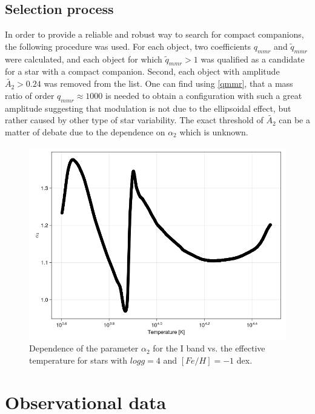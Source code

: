 \documentclass{pracalicmgr}
\begin{document}
\section{Selection process}
In order to provide  a reliable and robust way to search for compact companions, the following procedure was used.
For each object, two coefficients $q_{mmr}$ and $\tilde{q}_{mmr}$ were calculated, and each object for which $\tilde{q}_{mmr}>1$ was qualified as a candidate for a star with a compact companion.
Second, each object with amplitude $\tilde{A_2}>0.24$ was removed from the list. One can find using \ref{qmmr}, that a mass ratio of order $q_{mmr}\approx 1000$ is needed
to obtain a configuration with such a great amplitude
suggesting that modulation is not due to the ellipsoidal effect, but rather caused by other type of star variability.
The exact threshold of $\tilde{A_2}$ can be a matter of debate due to the dependence on $\alpha_2$ which is unknown. 
\begin{figure}[H]
    \centering
    \includegraphics[scale=0.4]{plots/A_2_dependence.png}
    \caption{Dependence of the parameter $\alpha_2$ for the I band vs. the effective temperature for stars with $log g = 4$ and $[Fe/H] = -1$ dex.}
    \label{claret}
\end{figure}

\chapter{Observational data}
\end{document}
